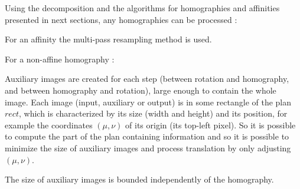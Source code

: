 Using the decomposition and the algorithms for homographies and affinities presented in next sections, any homographies can be processed :
 
 
 For an affinity the multi-pass resampling method is used.
 
 For a non-affine homography :
 
 Auxiliary images are created for each step (between rotation and homography, and between homography and rotation), large enough to contain the whole image. Each image (input, auxiliary or output) is in some rectangle of the plan $rect$, which is characterized by its size (width and height) and its position, for example the coordinates $(\mu,\nu)$ of its origin (its top-left pixel). So it is possible to compute the part of the plan containing information and so it is possible to minimize the size of auxiliary images and process translation by only adjusting $(\mu,\nu)$.
 
 \begin{prop}
 The size of auxiliary images is bounded independently of the homography.
 \end{prop}
 
 
 
